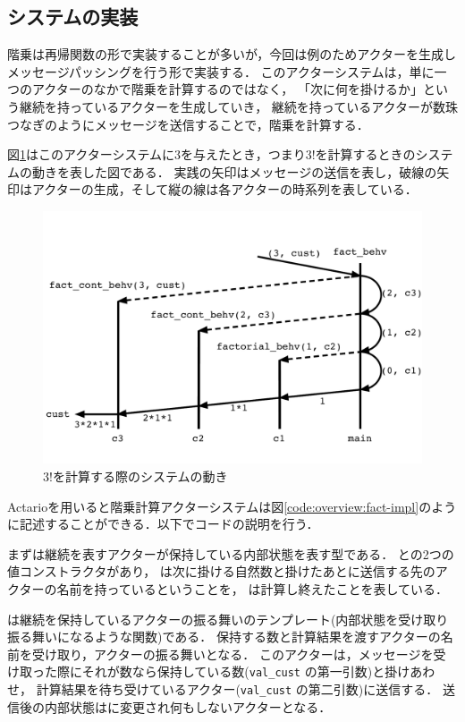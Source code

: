 \subsection{システムの実装}

階乗は再帰関数の形で実装することが多いが，今回は例のためアクターを生成しメッセージパッシングを行う形で実装する．
このアクターシステムは，単に一つのアクターのなかで階乗を計算するのではなく，
「次に何を掛けるか」という継続を持っているアクターを生成していき，
継続を持っているアクターが数珠つなぎのようにメッセージを送信することで，階乗を計算する．

図\ref{img:overview:fact}はこのアクターシステムに$3$を与えたとき，つまり$3!$を計算するときのシステムの動きを表した図である．
実践の矢印はメッセージの送信を表し，破線の矢印はアクターの生成，そして縦の線は各アクターの時系列を表している．

\begin{figure}[tp]
  \centering
  \includegraphics[width=15cm]{./img/overview/fact.pdf}
  \caption{$3!$を計算する際のシステムの動き}\label{img:overview:fact}
\end{figure}

Actarioを用いると階乗計算アクターシステムは図\ref{code:overview:fact-impl}のように記述することができる．以下でコードの説明を行う．

まずは継続を表すアクターが保持している内部状態を表す型である．
との2つの値コンストラクタがあり，
は次に掛ける自然数と掛けたあとに送信する先のアクターの名前を持っているということを，
は計算し終えたことを表している．

は継続を保持しているアクターの振る舞いのテンプレート(内部状態を受け取り振る舞いになるような関数)である．
保持する数と計算結果を渡すアクターの名前を受け取り，アクターの振る舞いとなる．
このアクターは，メッセージを受け取った際にそれが数なら保持している数(\lstinline{val_cust} の第一引数)と掛けあわせ，
計算結果を待ち受けているアクター(\lstinline{val_cust} の第二引数)に送信する．
送信後の内部状態はに変更され何もしないアクターとなる．

